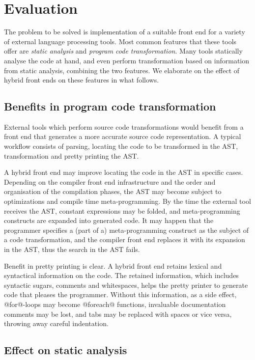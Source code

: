 \documentclass[11pt]{amsart}
\begin{document}
\section{Evaluation}
\label{sec:eval}

The problem to be solved is implementation of a suitable front end for
a variety of external language processing tools. Most common features
that these tools offer are \emph{static analysis} and \emph{program
  code transformation}. Many tools statically analyse the code at
hand, and even perform transformation based on information from static
analysis, combining the two features. We elaborate on the effect of
hybrid front ends on these features in what follows.

\subsection{Benefits in program code transformation}

External tools which perform source code transformations would
benefit from a front end that generates a more accurate source code
representation. A typical workflow consists of parsing, locating the
code to be transformed in the AST, transformation and pretty printing
the AST.

A hybrid front end may improve locating the code in the AST in
specific cases. Depending on the compiler front end infrastructure and
the order and organisation of the compilation phases, the AST may
become subject to optimizations and compile time meta-programming. By
the time the external tool receives the AST, constant expressions may
be folded, and meta-programming constructs are expanded into generated
code. It may happen that the programmer specifies a (part of a)
meta-programming construct as the subject of a code transformation,
and the compiler front end replaces it with its expansion in the AST,
thus the search in the AST fails.

Benefit in pretty printing is clear. A hybrid front end retains
lexical and syntactical information on the code. The retained
information, which includes syntactic sugars, comments and
whitespaces, helps the pretty printer to generate code that pleases
the programmer. Without this information, as a side effect,
@for@-loops may become @foreach@ functions, invaluable documentation
comments may be lost, and tabs may be replaced with spaces or vice
versa, throwing away careful indentation.

\subsection{Effect on static analysis}
\end{document}
